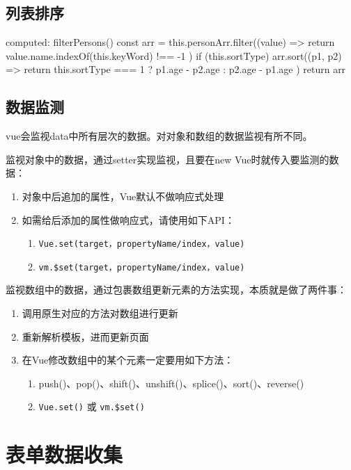 \subsection{列表排序}
\begin{js}
computed: {
    filterPersons() {
        const arr = this.personArr.filter((value) => {
            return value.name.indexOf(this.keyWord) !== -1
        })
        if (this.sortType) {
            arr.sort((p1, p2) => {
                return this.sortType === 1 ? p1.age - p2.age : p2.age - p1.age
            })
        }
        return arr
    }
}
\end{js}
\subsection{数据监测}
vue会监视data中所有层次的数据。对对象和数组的数据监视有所不同。

监视对象中的数据，通过setter实现监视，且要在new Vue时就传入要监测的数据：
\begin{enumerate}
    \item 对象中后追加的属性，Vue默认不做响应式处理
    \item 如需给后添加的属性做响应式，请使用如下API：
    \begin{enumerate}
        \item \verb|Vue.set(target，propertyName/index，value)|
        \item \verb|vm.$set(target，propertyName/index，value)|
    \end{enumerate}
\end{enumerate}

监视数组中的数据，通过包裹数组更新元素的方法实现，本质就是做了两件事：
\begin{enumerate}
    \item 调用原生对应的方法对数组进行更新
    \item 重新解析模板，进而更新页面
    \item 在Vue修改数组中的某个元素一定要用如下方法：
    \begin{enumerate}
        \item push()、pop()、shift()、unshift()、splice()、sort()、reverse()
        \item \verb|Vue.set()| 或 \verb|vm.$set()|
    \end{enumerate}
\end{enumerate}


\section{表单数据收集}
